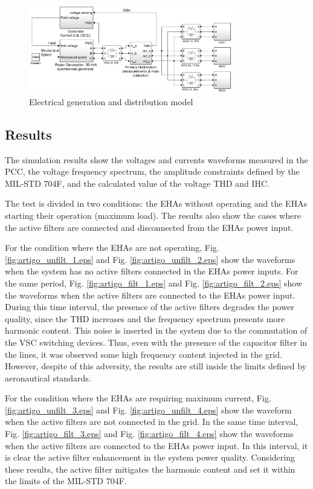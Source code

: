 \begin{figure}[!tb] %
	\centering
	\includegraphics[width=0.8\textwidth]{Figures/simulacao_simulink.png}
	\caption{Electrical generation and distribution model}
	\label{fig:simulacao_simulink.png}
\end{figure}

\subsection{Results}

The simulation results show the voltages and currents waveforms measured in the PCC, the voltage frequency spectrum, the amplitude constraints defined by the MIL-STD 704F, and the calculated value of the voltage THD and IHC.

The test is divided in two conditions:  the EHAs without operating and the EHAs starting their operation (maximum load). The results also show the cases where the active filters are connected and disconnected from the EHAs power input.

For the condition where the EHAs are not operating, Fig. \ref{fig:artigo_unfilt_1.eps} and Fig. \ref{fig:artigo_unfilt_2.eps} show the waveforms when the system has no active filters connected in the EHAs power inputs. For the same period, Fig. \ref{fig:artigo_filt_1.eps} and Fig. \ref{fig:artigo_filt_2.eps} show the waveforms when the active filters are connected to the EHAs power input. During this time interval, the presence of the active filters degrades the power quality, since the THD increases and the frequency spectrum presents more harmonic content. 
This noise is inserted in the system due to the commutation of the VSC switching devices. Thus, even with the presence of the capacitor filter in the lines, it was observed some high frequency content injected in the grid. However, despite of this adversity, the results are still inside the limits defined by aeronautical standards.

For the condition where the EHAs are requiring maximum current, Fig. \ref{fig:artigo_unfilt_3.eps} and Fig. \ref{fig:artigo_unfilt_4.eps} show the waveform when the active filters are not connected in the grid. In the same time interval, Fig. \ref{fig:artigo_filt_3.eps} and Fig. \ref{fig:artigo_filt_4.eps} show the waveforms when the active filters are connected to the EHAs power input. In this interval, it is clear the active filter enhancement in the system power quality. Considering these results, the active filter mitigates the harmonic content and set it within the limits of the MIL-STD 704F.

